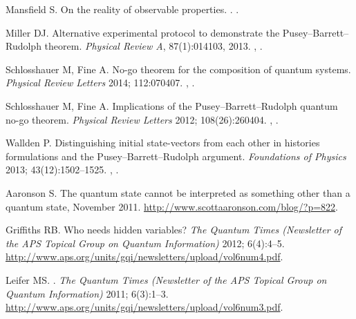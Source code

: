 \documentclass[DIV=calc,paper=a4,fontsize=11pt,twocolumn]{scrartcl} %
\theoremstyle{definition}
\theoremstyle{plain}
\begin{document}
\begin{thebibliography}{10}
Mansfield S.
\newblock On the reality of observable properties.
.
\newblock \href {http://arxiv.org/abs/1306.3216} {}.

Miller DJ.
\newblock Alternative experimental protocol to demonstrate the
Pusey--Barrett--Rudolph theorem.
\newblock \emph{Physical Review A}, 87(1):014103, 2013.
\newblock \href {http://arxiv.org/abs/1202.6465} {},
\href {http://dx.doi.org/10.1103/PhysRevA.87.014103}
{}.

Schlosshauer M, Fine A.
\newblock No-go theorem for the composition of quantum systems.
\newblock \emph{Physical Review Letters} 2014; 112:070407.
\newblock \href {http://arxiv.org/abs/1306.5805} {},
\href {http://dx.doi.org/10.1103/PhysRevLett.112.070407}
{}.

Schlosshauer M, Fine A.
\newblock Implications of the Pusey--Barrett--Rudolph quantum no-go theorem.
\newblock \emph{Physical Review Letters} 2012; 108(26):260404.
\newblock \href {http://arxiv.org/abs/1203.4779} {},
\href {http://dx.doi.org/10.1103/PhysRevLett.108.260404}
{}.

Wallden P.
\newblock Distinguishing initial state-vectors from each other in histories
formulations and the Pusey--Barrett--Rudolph argument.
\newblock \emph{Foundations of Physics} 2013; 43(12):1502--1525.
\newblock \href {http://arxiv.org/abs/1211.2084} {},
\href {http://dx.doi.org/10.1007/s10701-013-9759-8}
{}.

Aaronson S.
\newblock The quantum state cannot be interpreted as something other than a
quantum state, November 2011.
\newblock \url{http://www.scottaaronson.com/blog/?p=822}.

Griffiths RB.
\newblock Who needs hidden variables?
\newblock \emph{The Quantum Times (Newsletter of the APS Topical Group on
Quantum Information)} 2012; 6(4):4--5.
\newblock \url{http://www.aps.org/units/gqi/newsletters/upload/vol6num4.pdf}.

Leifer MS.
.
\newblock \emph{The Quantum Times (Newsletter of the APS Topical Group on
Quantum Information)} 2011; 6(3):1--3.
\newblock \url{http://www.aps.org/units/gqi/newsletters/upload/vol6num3.pdf}.


\end{thebibliography}
\end{document}
